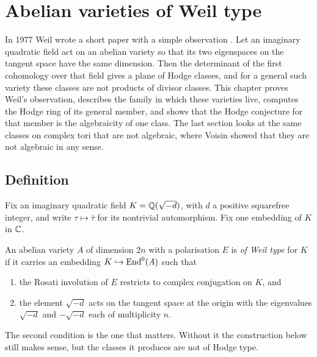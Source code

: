 \chapter{Abelian varieties of Weil type}\label{ch:weil}

In 1977 Weil wrote a short paper with a simple observation \cite{Weil77}.
Let an imaginary quadratic field act on an abelian variety so that its two
eigenspaces on the tangent space have the same dimension. Then the
determinant of the first cohomology over that field gives a plane of
Hodge classes, and for a general such variety these classes are not
products of divisor classes. This chapter proves Weil's observation,
describes the family in which these varieties live, computes the Hodge
ring of its general member, and shows that the Hodge conjecture for that
member is the algebraicity of one class. The last section looks at the
same classes on complex tori that are not algebraic, where Voisin showed
that they are not algebraic in any sense.

\section{Definition}

Fix an imaginary quadratic field $K=\mathbb{Q}(\sqrt{-d})$, with $d$ a positive
squarefree integer, and write $\tau\mapsto\bar\tau$ for its nontrivial
automorphism. Fix one embedding of $K$ in $\mathbb{C}$.

\begin{definition}\label{def:weiltype}
An abelian variety $A$ of dimension $2n$ with a polarisation $E$ is
\emph{of Weil type} for $K$ if it carries an embedding
$K\hookrightarrow\operatorname{End}^{0}(A)$ such that
\begin{enumerate}[label=(\roman*)]
\item the Rosati involution of $E$ restricts to complex conjugation on
$K$, and
\item the element $\sqrt{-d}$ acts on the tangent space at the origin with
the eigenvalues $\sqrt{-d}$ and $-\sqrt{-d}$ each of multiplicity $n$.
\end{enumerate}
\end{definition}

The second condition is the one that matters. Without it the
construction below still makes sense, but the classes it produces are not
of Hodge type.

